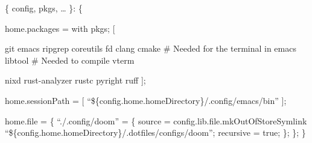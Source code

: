 \documentclass[11pt]{article}
\date{\today}
\title{}
\begin{document}
\tableofcontents

\{ config, pkgs, \ldots{} \}: \{

home.packages = with pkgs; [

git
emacs
ripgrep
coreutils
fd
clang
cmake  \# Needed for the terminal in emacs
libtool \# Needed to compile vterm

  nixd
  rust-analyzer
  rustc
  pyright
  ruff
];

home.sessionPath = [
  ``\$\{config.home.homeDirectory\}/.config/emacs/bin''
];

  home.file = \{
    ``./.config/doom'' = \{
      source = config.lib.file.mkOutOfStoreSymlink ``\$\{config.home.homeDirectory\}/.dotfiles/configs/doom'';
      recursive = true;
    \};
  \};
\}
\end{document}
